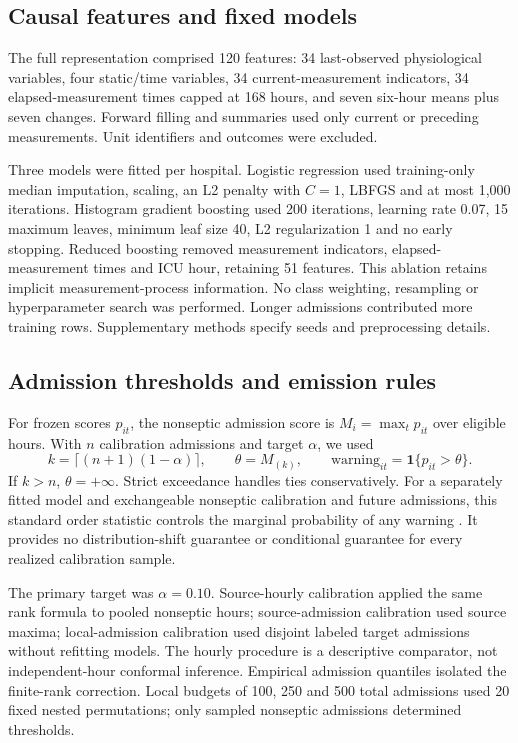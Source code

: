 \documentclass[preprint,12pt]{elsarticle}
\begin{document}


\subsection{Causal features and fixed models}
The full representation comprised 120 features: 34 last-observed physiological variables, four static/time variables, 34 current-measurement indicators, 34 elapsed-measurement times capped at 168 hours, and seven six-hour means plus seven changes. Forward filling and summaries used only current or preceding measurements. Unit identifiers and outcomes were excluded.

Three models were fitted per hospital. Logistic regression used training-only median imputation, scaling, an L2 penalty with $C=1$, LBFGS and at most 1,000 iterations. Histogram gradient boosting used 200 iterations, learning rate 0.07, 15 maximum leaves, minimum leaf size 40, L2 regularization 1 and no early stopping. Reduced boosting removed measurement indicators, elapsed-measurement times and ICU hour, retaining 51 features. This ablation retains implicit measurement-process information. No class weighting, resampling or hyperparameter search was performed. Longer admissions contributed more training rows. Supplementary methods specify seeds and preprocessing details.

\subsection{Admission thresholds and emission rules}
For frozen scores $p_{it}$, the nonseptic admission score is $M_i=\max_t p_{it}$ over eligible hours. With $n$ calibration admissions and target $\alpha$, we used
\begin{equation}
 k=\lceil(n+1)(1-\alpha)\rceil,\qquad
 \theta=M_{(k)},\qquad \mathrm{warning}_{it}=\mathbf{1}\{p_{it}>\theta\}.
\end{equation}
If $k>n$, $\theta=+\infty$. Strict exceedance handles ties conservatively. For a separately fitted model and exchangeable nonseptic calibration and future admissions, this standard order statistic controls the marginal probability of any warning \cite{angelopoulos}. It provides no distribution-shift guarantee or conditional guarantee for every realized calibration sample.

The primary target was $\alpha=0.10$. Source-hourly calibration applied the same rank formula to pooled nonseptic hours; source-admission calibration used source maxima; local-admission calibration used disjoint labeled target admissions without refitting models. The hourly procedure is a descriptive comparator, not independent-hour conformal inference. Empirical admission quantiles isolated the finite-rank correction. Local budgets of 100, 250 and 500 total admissions used 20 fixed nested permutations; only sampled nonseptic admissions determined thresholds.
\end{document}
